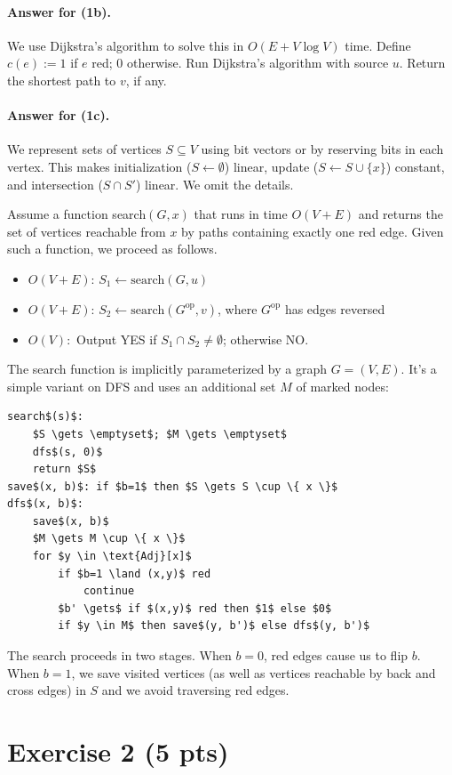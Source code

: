 \documentclass[a4paper]{article}
\begin{document}
\paragraph{Answer for (1b).}
We use Dijkstra's algorithm to solve this in $O(E + V \log V)$ time.
	Define $c(e) := 1$ if $e$ red; $0$ otherwise.
	Run Dijkstra's algorithm with source $u$.
	Return the shortest path to $v$, if any.

\paragraph{Answer for (1c).}
We represent sets of vertices $S \subseteq V$ using bit vectors or by reserving bits in each vertex.
This makes initialization ($S \gets \emptyset$) linear, update ($S \gets S \cup \{ x \}$) constant, and intersection ($S \cap S'$) linear.
We omit the details.

Assume a function search$(G, x)$ that runs in time $O(V+E)$ and returns the set of vertices reachable from $x$ by paths containing exactly one red edge.
Given such a function, we proceed as follows.
\begin{itemize}
	\item
	$O(V+E)$: $S_1 \gets \text{search}(G, u)$

	\item
	$O(V+E)$: $S_2 \gets \text{search}(G^\text{op}, v)$, where $G^\text{op}$ has edges reversed

	\item
	$O(V):$ Output YES if $S_1 \cap S_2 \not= \emptyset$; otherwise NO.
\end{itemize}
The search function is implicitly parameterized by a graph $G=(V,E)$.
It's a simple variant on DFS and uses an additional set $M$ of marked nodes:
\begin{lstlisting}[numbers=none,xleftmargin=1cm]
search$(s)$:
	$S \gets \emptyset$; $M \gets \emptyset$
	dfs$(s, 0)$
	return $S$
save$(x, b)$: if $b=1$ then $S \gets S \cup \{ x \}$
dfs$(x, b)$:
	save$(x, b)$
	$M \gets M \cup \{ x \}$
	for $y \in \text{Adj}[x]$
		if $b=1 \land (x,y)$ red
			continue
		$b' \gets$ if $(x,y)$ red then $1$ else $0$
		if $y \in M$ then save$(y, b')$ else dfs$(y, b')$\end{lstlisting}
The search proceeds in two stages.
When $b=0$, red edges cause us to flip $b$.
When $b=1$, we save visited vertices (as well as vertices reachable by back and cross edges) in $S$ and we avoid traversing red edges.

\section*{Exercise 2 (5 pts)}
\end{document}
